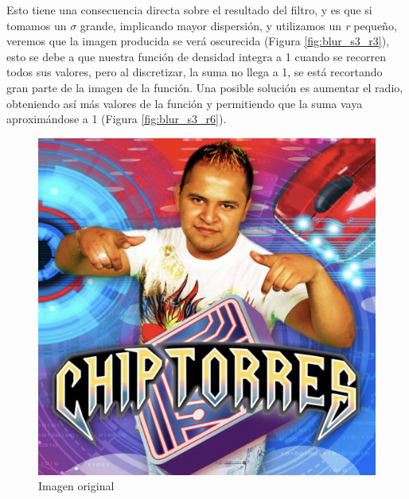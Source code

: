 Esto tiene una consecuencia directa sobre el resultado del filtro, y es que si
tomamos un $\sigma$ grande, implicando mayor dispersión, y utilizamos un
\textit{r} pequeño, veremos que la imagen producida se verá oscurecida (Figura \ref{fig:blur_s3_r3}), esto
se debe a que nuestra función de densidad integra a 1 cuando se recorren todos
sus valores, pero al discretizar, la suma no llega a 1, se está recortando gran
parte de la imagen de la función. Una posible solución es aumentar el radio,
obteniendo así más valores de la función y permitiendo que la suma vaya
aproximándose a 1 (Figura \ref{fig:blur_s3_r6}).


\begin{figure}[H]
	\centering
	\begin{minipage}{.3\textwidth}
		\centering
		\includegraphics[width=\linewidth]{imgs/blur_original.jpg}
		\caption{Imagen original}
		\label{fig:blur_original}
	\end{minipage}\hfill
	\begin{minipage}{.3\textwidth}
		\centering

\end{minipage}
\end{figure}
